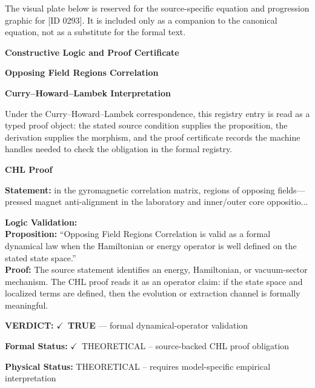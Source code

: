 \begingroup\footnotesize\sloppy
The visual plate below is reserved for the source-specific equation and progression graphic for [ID 0293]. It is included only as a companion to the canonical equation, not as a substitute for the formal text.
\par\endgroup
\ifTZPDarkEdition
{}
\fi

\clearpage
\begingroup\tzpsupportsetup
\noindent\textbf{\fontsize{10.8pt}{12.8pt}\selectfont [ID 0293] Constructive Logic and Proof Certificate}\par
\noindent\textbf{\fontsize{10pt}{12pt}\selectfont Opposing Field Regions Correlation}\par
\vspace{0.45em}
\begingroup
\footnotesize
\setlength{\parskip}{0.22em}
\setlength{\parindent}{0pt}
\noindent\textbf{Curry--Howard--Lambek Interpretation}\par
Under the Curry--Howard--Lambek correspondence, this registry entry is read as a typed proof
object: the stated source condition supplies the proposition, the derivation supplies the
morphism, and the proof certificate records the machine handles needed to check the obligation
in the formal registry.

\vspace{0.45em}
\noindent\textbf{CHL Proof}\par
\textbf{Statement:} in the gyromagnetic correlation matrix, regions of opposing fields---pressed magnet
anti-alignment in the laboratory and inner/outer core oppositio...

\textbf{Logic Validation:}\\
\textbf{Proposition:} ``Opposing Field Regions Correlation is valid as a formal dynamical law when the
Hamiltonian or energy operator is well defined on the stated state space.''\\
\textbf{Proof:} The source statement identifies an energy, Hamiltonian, or vacuum-sector mechanism. The
CHL proof reads it as an operator claim: if the state space and localized terms are
defined, then the evolution or extraction channel is formally meaningful.

\textbf{VERDICT:} \ensuremath{\checkmark}\ \textbf{TRUE} --- formal dynamical-operator validation

\textbf{Formal Status:} \ensuremath{\checkmark}\ THEORETICAL -- source-backed CHL proof obligation

\textbf{Physical Status:} THEORETICAL -- requires model-specific empirical interpretation
\par\vspace{0.45em}
\par
\ifTZPDarkEdition
{}
\fi
\endgroup
\endgroup
